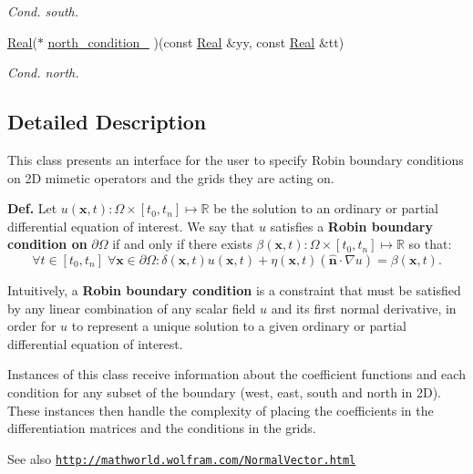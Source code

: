 \begin{DoxyCompactItemize}
\begin{DoxyCompactList}\small\item\em Cond. south. \end{DoxyCompactList}\item 
\hyperlink{group__c01-roots_gac080bbbf5cbb5502c9f00405f894857d}{Real}($\ast$ \hyperlink{classmtk_1_1RobinBCDescriptor2D_ad2a1e821b0c6d226a8b884baadcf1f1b}{north\+\_\+condition\+\_\+} )(const \hyperlink{group__c01-roots_gac080bbbf5cbb5502c9f00405f894857d}{Real} \&yy, const \hyperlink{group__c01-roots_gac080bbbf5cbb5502c9f00405f894857d}{Real} \&tt)
\begin{DoxyCompactList}\small\item\em Cond. north. \end{DoxyCompactList}\end{DoxyCompactItemize}


\subsection{Detailed Description}
This class presents an interface for the user to specify Robin boundary conditions on 2\+D mimetic operators and the grids they are acting on.

{\bfseries Def.} Let $ u(\mathbf{x},t):\Omega\times [t_0, t_n]\mapsto\mathbb{R} $ be the solution to an ordinary or partial differential equation of interest. We say that $ u $ satisfies a {\bfseries Robin boundary condition on} $ \partial\Omega $ if and only if there exists $ \beta(\mathbf{x},t):\Omega\times [t_0, t_n]\mapsto\mathbb{R} $ so that\+: \[ \forall t \in [t_0,t_n]\; \forall \mathbf{x} \in \partial\Omega: \delta(\mathbf{x},t)u(\mathbf{x},t) + \eta(\mathbf{x},t)(\hat{\mathbf{n}}\cdot\nabla u) = \beta(\mathbf{x},t). \]

Intuitively, a {\bfseries Robin boundary condition} is a constraint that must be satisfied by any linear combination of any scalar field $ u $ and its first normal derivative, in order for $ u $ to represent a unique solution to a given ordinary or partial differential equation of interest.

Instances of this class receive information about the coefficient functions and each condition for any subset of the boundary (west, east, south and north in 2\+D). These instances then handle the complexity of placing the coefficients in the differentiation matrices and the conditions in the grids.

\begin{DoxySeeAlso}{See also}
\href{http://mathworld.wolfram.com/NormalVector.html}{\tt http\+://mathworld.\+wolfram.\+com/\+Normal\+Vector.\+html} 
\end{DoxySeeAlso}


